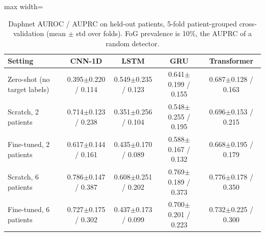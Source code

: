 \begin{table}[ht]
\centering
\footnotesize
\caption{Daphnet AUROC / AUPRC on held-out patients, 5-fold patient-grouped cross-validation (mean $\pm$ std over folds). FoG prevalence is 10\%, the AUPRC of a random detector.}
\label{tab:adaptation}
\setlength{\tabcolsep}{3pt}
\begin{adjustbox}{max width=\textwidth}
\begin{tabular}{lcccc}
\toprule
Setting & CNN-1D & LSTM & GRU & Transformer \\
\midrule
Zero-shot (no target labels) & 0.395$\pm$0.220 / 0.114 & 0.549$\pm$0.235 / 0.123 & 0.641$\pm$0.199 / 0.155 & 0.687$\pm$0.128 / 0.163 \\
Scratch, 2 patients & 0.714$\pm$0.123 / 0.238 & 0.351$\pm$0.256 / 0.104 & 0.548$\pm$0.255 / 0.195 & 0.696$\pm$0.153 / 0.215 \\
Fine-tuned, 2 patients & 0.617$\pm$0.144 / 0.161 & 0.435$\pm$0.170 / 0.089 & 0.588$\pm$0.167 / 0.132 & 0.668$\pm$0.195 / 0.179 \\
Scratch, 6 patients & 0.786$\pm$0.147 / 0.387 & 0.608$\pm$0.251 / 0.202 & 0.769$\pm$0.189 / 0.373 & 0.776$\pm$0.178 / 0.350 \\
Fine-tuned, 6 patients & 0.727$\pm$0.175 / 0.302 & 0.437$\pm$0.173 / 0.099 & 0.700$\pm$0.201 / 0.223 & 0.732$\pm$0.225 / 0.300 \\
\bottomrule
\end{tabular}
\end{adjustbox}
\end{table}
